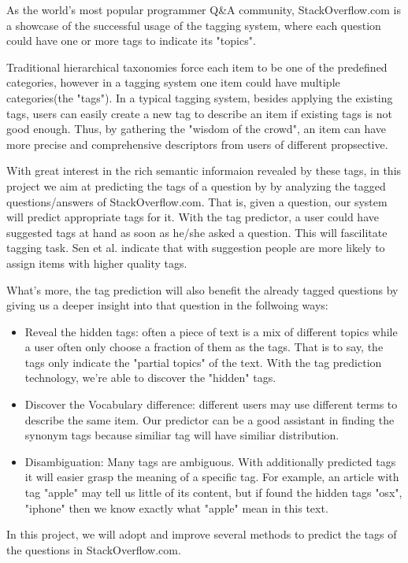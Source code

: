 
As the world's most popular programmer Q\&A community, StackOverflow.com is a showcase of the successful usage of the tagging system, where each question could have one or more tags to indicate its "topics". 

Traditional hierarchical taxonomies force each item to be one of the predefined categories, however in a tagging system one item could have multiple categories(the "tags"). In a typical tagging system, besides applying the existing tags, users can easily create a new tag to describe an item if existing tags is not good enough. Thus, by gathering the "wisdom of the crowd", an item can have more precise and comprehensive descriptors from users of different propsective. 

With great interest in the rich semantic informaion revealed by these tags, in this project we aim at predicting the tags of a question by 
by analyzing the tagged questions/answers of StackOverflow.com. That is, given a question, our system will predict appropriate tags for it. With the tag predictor, a user could have suggested tags at hand as soon as he/she asked a question. This will fascilitate tagging task. Sen et al.\cite{Sen2006} indicate that with suggestion people are more likely to assign items with higher quality tags.

What's more, the tag prediction will also benefit the already tagged questions by giving us a deeper insight into that question in the follwoing ways:

\begin{itemize}
    \item Reveal the hidden tags: often a piece of text is a mix of different topics while a user often only choose a fraction of them as the tags. That is to say, the tags only indicate the "partial topics" of the text. With the tag prediction technology, we're able to discover the "hidden" tags.
    \item Discover the Vocabulary difference: different users may use different terms to describe the same item. Our predictor can be a good assistant in finding the synonym tags because similiar tag will have similiar distribution.
    \item Disambiguation: Many tags are ambiguous. With additionally predicted tags it will easier grasp the meaning of a specific tag. For example, an article with tag "apple" may tell us little of its content, but if found the hidden tags "osx", "iphone" then we know exactly what "apple" mean in this text.
\end{itemize}

In this project, we will adopt and improve several methods to predict the tags of the questions in StackOverflow.com.
